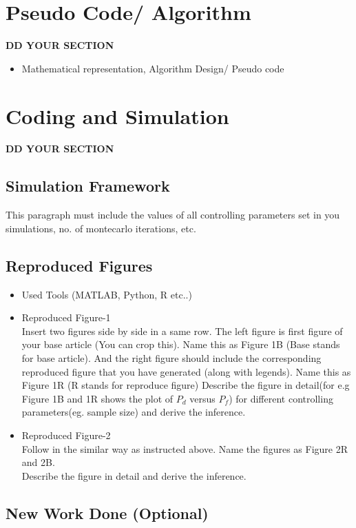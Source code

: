 \documentclass{article}
\begin{document}
\section{Pseudo Code/ Algorithm }
\textbf{DD YOUR SECTION}

\begin{itemize}
    \item Mathematical representation, Algorithm Design/ Pseudo code
\end{itemize}
\section{Coding and Simulation}
\textbf{DD YOUR SECTION }
\subsection{Simulation Framework}
\justify This paragraph must include the values of all controlling parameters set in you simulations, no. of montecarlo iterations, etc.
\subsection{Reproduced Figures}
\begin{itemize}
\item Used Tools (MATLAB, Python, R etc..)
\item Reproduced Figure-1\\
Insert two figures side by side in a same row. The left figure is first figure of your base article (You can crop this). Name this as Figure 1B (Base stands for base article). And the right figure should include the corresponding reproduced figure that you have generated (along with legends). Name this as Figure 1R (R stands for reproduce figure)
Describe the figure in detail(for e.g Figure 1B and 1R shows the plot of $P_d$ versus $P_f$) for different controlling parameters(eg. sample size) and derive the inference.

\item Reproduced Figure-2\\
Follow in the similar way as instructed above. Name the figures as Figure 2R and 2B. \\
Describe the figure in detail and derive the inference.
\end{itemize}

\subsection{New Work Done (Optional)}
\end{document}
